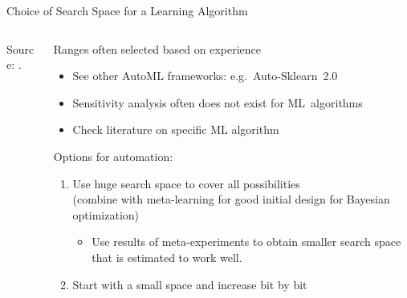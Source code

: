 \begin{frame}{Choice of Search Space for a Learning Algorithm}
  \begin{columns}
  	
  	\begin{column}{0.4\textwidth}
  		\begin{center}
  			
  			{\tiny Source: .}
  			
  		\end{center}
  	\end{column}
  	
    \begin{column}{0.6\textwidth}
    
    Ranges often selected based on experience
    \begin{itemize}

      \item See other AutoML frameworks: e.g.\ Auto-Sklearn~2.0 

      \item Sensitivity analysis often does not exist for ML~algorithms
      \item Check literature on specific ML algorithm
    \end{itemize}
	\pause
    Options for automation:
    \begin{enumerate}
      \item Use huge search space to cover all possibilities \\ 
            (combine with meta-learning for good initial design for Bayesian optimization)
      \begin{itemize} 
      		\item Use results of meta-experiments to obtain smaller search space that is estimated to work well.
       \end{itemize}
   		\pause
   	  \item Start with a small space and increase bit by bit
    \end{enumerate}
    \end{column}%

  \end{columns}
\end{frame}

